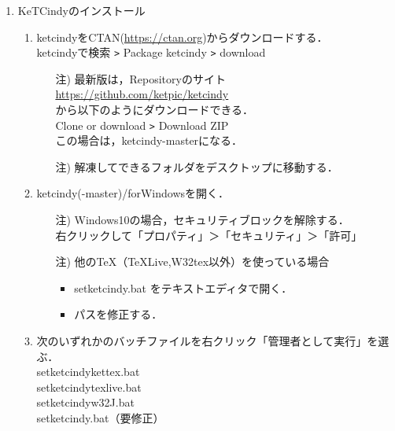 \documentclass{ujarticle}
\begin{document}
\begin{enumerate}[\bf\large 1.]
\item KeTCindyのインストール
  \begin{enumerate}[(1)]
  \item ketcindyをCTAN(\url{https://ctan.org})からダウンロードする．\\
  \hspace*{10mm}ketcindyで検索 \verb|>| Package ketcindy \verb|>| download
    \begin{itemize}
    \item[注)]最新版は，Repositoryのサイト\\
        \hspace*{10mm}\url{https://github.com/ket­pic/ketcindy}\\
       から以下のようにダウンロードできる．\\
        \hspace*{10mm}Clone or download \verb|>| Download ZIP\\
        この場合は，ketcindy-masterになる．
    \item[注)]解凍してできるフォルダをデスクトップに移動する．
    \end{itemize}
  \item ketcindy(-master)/forWindowsを開く．
    \begin{itemize}
    \item[注)]Windows10の場合，セキュリティブロックを解除する．\\
\hspace*{5mm}右クリックして「プロパティ」＞「セキュリティ」＞「許可」
    \item[注)]他のTeX（TeXLive,W32tex以外）を使っている場合
      \begin{itemize}
      \item setketcindy.bat をテキストエディタで開く．
      \item パスを修正する．
      \end{itemize}
    \end{itemize}
  \item 次のいずれかのバッチファイルを右クリック「管理者として実行」を選ぶ．\\
  \hspace*{3zw} setketcindykettex.bat\\
  \hspace*{3zw} setketcindytexlive.bat\\
  \hspace*{3zw} setketcindyw32J.bat\\
  \hspace*{3zw} setketcindy.bat（要修正）

\end{enumerate}
\end{enumerate}
\end{document}
